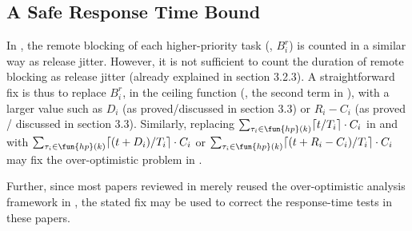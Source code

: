 \subsection{A Safe Response Time Bound}
\label{sec:safe_bound}

In , the remote blocking of each higher-priority task (\ie, $B_i^r$) is counted in a similar way as release jitter. However, it is not sufficient to count the duration of remote blocking as release jitter (already explained in section 3.2.3). A straightforward fix is thus to replace $B_i^r$, in the ceiling function (\ie, the second term in ), with a larger value such as $D_i$ (as proved/discussed in section 3.3) or $R_i - C_i$ (as proved / discussed in section 3.3). Similarly, replacing $\sum_{\tau_i \in \fun{hp}(k)} \lceil t / T_i \rceil \cdot C_i$ in  and  with $\sum_{\tau_i \in \fun{hp}(k)} \lceil (t+D_i) / T_i \rceil \cdot C_i$ or $\sum_{\tau_i \in \fun{hp}(k)} \lceil (t+R_i-C_i) / T_i \rceil \cdot C_i$ may fix the over-optimistic problem in \cite{NBN:11}.

Further, since most papers reviewed in  merely reused the over-optimistic analysis framework in \cite{lakshmanan-2009}, the stated fix may be used to correct the response-time tests in these papers.